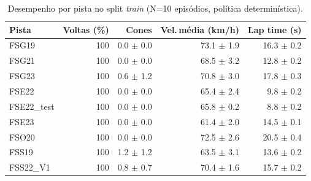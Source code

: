 \begin{table}[H]
\centering
\caption{Desempenho por pista no split \textit{train} (N=10 episódios, política determinística).}
\label{tab:per_track_train}
\begin{tabular}{lrrrr}
\toprule
\textbf{Pista} & \textbf{Voltas (\%)} & \textbf{Cones} & \textbf{Vel.\,m\'edia (km/h)} & \textbf{Lap time (s)} \\
\midrule
FSG19 & 100 & 0.0 $\pm$ 0.0 & 73.1 $\pm$ 1.9 & 16.3 $\pm$ 0.2 \\
FSG21 & 100 & 0.0 $\pm$ 0.0 & 68.5 $\pm$ 3.2 & 12.8 $\pm$ 0.2 \\
FSG23 & 100 & 0.6 $\pm$ 1.2 & 70.8 $\pm$ 3.0 & 17.8 $\pm$ 0.3 \\
FSE22 & 100 & 0.0 $\pm$ 0.0 & 65.4 $\pm$ 2.4 & 9.8 $\pm$ 0.2 \\
FSE22_test & 100 & 0.0 $\pm$ 0.0 & 65.8 $\pm$ 0.2 & 8.8 $\pm$ 0.2 \\
FSE23 & 100 & 0.0 $\pm$ 0.0 & 61.4 $\pm$ 2.0 & 14.5 $\pm$ 0.1 \\
FSO20 & 100 & 0.0 $\pm$ 0.0 & 72.5 $\pm$ 2.6 & 20.5 $\pm$ 0.4 \\
FSS19 & 100 & 1.2 $\pm$ 1.2 & 63.5 $\pm$ 3.1 & 13.6 $\pm$ 0.2 \\
FSS22_V1 & 100 & 0.8 $\pm$ 0.7 & 70.4 $\pm$ 1.6 & 15.7 $\pm$ 0.2 \\
\bottomrule
\end{tabular}
\end{table}
